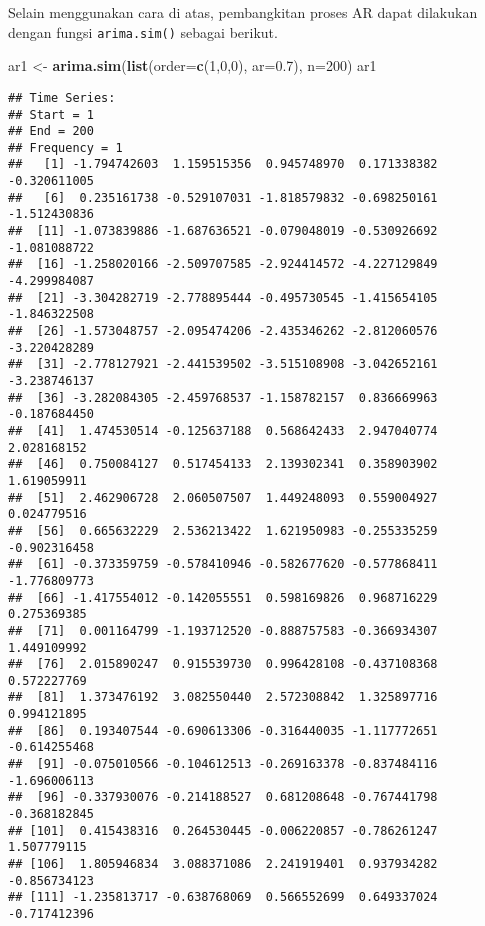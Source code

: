 \documentclass[
]{article}
\newenvironment{Shaded}{\begin{snugshade}}{\end{snugshade}}
\newcommand{\AttributeTok}[1]{\textcolor[rgb]{0.13,0.29,0.53}{#1}}
\newcommand{\DecValTok}[1]{\textcolor[rgb]{0.00,0.00,0.81}{#1}}
\newcommand{\FloatTok}[1]{\textcolor[rgb]{0.00,0.00,0.81}{#1}}
\newcommand{\FunctionTok}[1]{\textcolor[rgb]{0.13,0.29,0.53}{\textbf{#1}}}
\newcommand{\NormalTok}[1]{#1}
\newcommand{\OtherTok}[1]{\textcolor[rgb]{0.56,0.35,0.01}{#1}}
\begin{document}
Selain menggunakan cara di atas, pembangkitan proses AR dapat dilakukan
dengan fungsi \texttt{arima.sim()} sebagai berikut.

\begin{Shaded}
\begin{Highlighting}[]
\NormalTok{ar1 }\OtherTok{\textless{}{-}} \FunctionTok{arima.sim}\NormalTok{(}\FunctionTok{list}\NormalTok{(}\AttributeTok{order=}\FunctionTok{c}\NormalTok{(}\DecValTok{1}\NormalTok{,}\DecValTok{0}\NormalTok{,}\DecValTok{0}\NormalTok{), }\AttributeTok{ar=}\FloatTok{0.7}\NormalTok{), }\AttributeTok{n=}\DecValTok{200}\NormalTok{)}
\NormalTok{ar1}
\end{Highlighting}
\end{Shaded}

\begin{verbatim}
## Time Series:
## Start = 1 
## End = 200 
## Frequency = 1 
##   [1] -1.794742603  1.159515356  0.945748970  0.171338382 -0.320611005
##   [6]  0.235161738 -0.529107031 -1.818579832 -0.698250161 -1.512430836
##  [11] -1.073839886 -1.687636521 -0.079048019 -0.530926692 -1.081088722
##  [16] -1.258020166 -2.509707585 -2.924414572 -4.227129849 -4.299984087
##  [21] -3.304282719 -2.778895444 -0.495730545 -1.415654105 -1.846322508
##  [26] -1.573048757 -2.095474206 -2.435346262 -2.812060576 -3.220428289
##  [31] -2.778127921 -2.441539502 -3.515108908 -3.042652161 -3.238746137
##  [36] -3.282084305 -2.459768537 -1.158782157  0.836669963 -0.187684450
##  [41]  1.474530514 -0.125637188  0.568642433  2.947040774  2.028168152
##  [46]  0.750084127  0.517454133  2.139302341  0.358903902  1.619059911
##  [51]  2.462906728  2.060507507  1.449248093  0.559004927  0.024779516
##  [56]  0.665632229  2.536213422  1.621950983 -0.255335259 -0.902316458
##  [61] -0.373359759 -0.578410946 -0.582677620 -0.577868411 -1.776809773
##  [66] -1.417554012 -0.142055551  0.598169826  0.968716229  0.275369385
##  [71]  0.001164799 -1.193712520 -0.888757583 -0.366934307  1.449109992
##  [76]  2.015890247  0.915539730  0.996428108 -0.437108368  0.572227769
##  [81]  1.373476192  3.082550440  2.572308842  1.325897716  0.994121895
##  [86]  0.193407544 -0.690613306 -0.316440035 -1.117772651 -0.614255468
##  [91] -0.075010566 -0.104612513 -0.269163378 -0.837484116 -1.696006113
##  [96] -0.337930076 -0.214188527  0.681208648 -0.767441798 -0.368182845
## [101]  0.415438316  0.264530445 -0.006220857 -0.786261247  1.507779115
## [106]  1.805946834  3.088371086  2.241919401  0.937934282 -0.856734123
## [111] -1.235813717 -0.638768069  0.566552699  0.649337024 -0.717412396

\end{verbatim}
\end{document}
